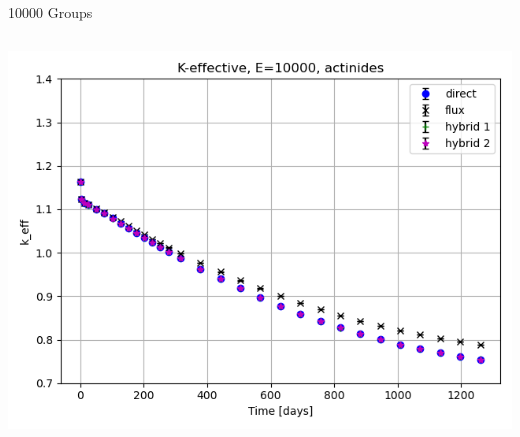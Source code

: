 \documentclass[
	11pt, %
	aspectratio=169, %
]{beamer}
\begin{document}
\begin{frame}{10000 Groups}
	\begin{columns}[c] %
		\begin{column}{0.32\textwidth} %
			\includegraphics[width=\textwidth]{../figures/keff/keff_actinides_10000.png}


\end{column}
\end{columns}
\end{frame}
\end{document}
